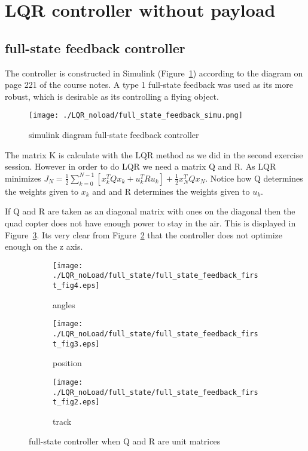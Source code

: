 \section{LQR controller without payload}
\subsection{full-state feedback controller}

The controller is constructed in Simulink (Figure~\ref{fig:diagram full-state feedback controller}) according to the diagram on page 221 of the course notes. A type 1 full-state feedback was used as its more robust, which is desirable as its controlling a flying object. 

\begin{figure}[H]
	\centering
	\texttt{[image: ./LQR\_noload/full\_state\_feedback\_simu.png]}
	\caption{simulink diagram full-state feedback controller}
	\label{fig:diagram full-state feedback controller}
\end{figure}

The matrix K is calculate with the LQR method as we did in the second exercise session. However in order to do LQR we need a matrix Q and R. As LQR minimizes $J_N = \frac{1}{2} \sum_{k=0}^{N-1}[x_k^TQx_k + u^T_kRu_k] + \frac{1}{2}x_N^TQx_N$. Notice how Q determines the weights given to $x_k$ and and R determines the weights given to $u_k$. 

If Q and R are taken as an diagonal matrix with ones on the diagonal then the quad copter does not have enough power to stay in the air. This is displayed in Figure~\ref{fig:full-state controller with simple diagonal matrices as Q and R}. Its very clear from Figure~\ref{fig:full-state controller with simple diagonal matrices as Q and R demo bad z position} that the controller does not optimize enough on the z axis.

\begin{figure}[H]
	\centering
	\begin{subfigure}[b]{0.3\textwidth}
		\texttt{[image: ./LQR\_noLoad/full\_state/full\_state\_feedback\_first\_fig4.eps]}
		\caption{angles}
	\end{subfigure}
	\begin{subfigure}[b]{0.3\textwidth}
		\texttt{[image: ./LQR\_noLoad/full\_state/full\_state\_feedback\_first\_fig3.eps]}
		\caption{position}
		\label{fig:full-state controller with simple diagonal matrices as Q and R demo bad z position}
	\end{subfigure}
	\begin{subfigure}[b]{0.3\textwidth}
		\texttt{[image: ./LQR\_noLoad/full\_state/full\_state\_feedback\_first\_fig2.eps]}
		\caption{track}
	\end{subfigure}
	\caption{full-state controller when Q and R are unit matrices}\label{fig:full-state controller with simple diagonal matrices as Q and R}
\end{figure}

